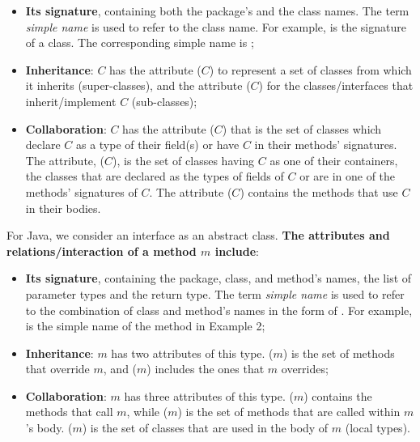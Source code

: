 \begin{itemize}

\item {\bf Its signature}, containing both the package's and the
  class names. The term \emph{simple name} is used to refer to the
  class name. For example,
   is the
  signature of a class. The corresponding simple name is
  ;

\item {\bf Inheritance}: $C$ has the attribute
  ($C$) to represent a set of classes from which it
  inherits (super-classes), and the attribute ($C$)
  for the classes/interfaces that inherit/implement $C$ (sub-classes);

\item {\bf Collaboration}: $C$ has the attribute
  ($C$) that is the set of classes which declare $C$ as
  a type of their field(s) or have $C$ in their methods'
  signatures. The attribute, ($C$), is the set of
  classes having $C$ as one of their containers, \ie the classes that
  are declared as the types of fields of $C$ or are in one of the
  methods' signatures of $C$. The attribute ($C$) contains
  the methods that use $C$ in their bodies.

\end{itemize}

\noindent For Java, we consider an interface as an abstract class. {\bf The
attributes and relations/interaction of a method $m$ include}:

\begin{itemize}

\item {\bf Its signature}, containing the package, class, and method's
names, the list of parameter types and the return type. The term {\em
simple name} is used to refer to the combination of class and
method's names in the form of . For example,
 is the simple name of the method in
Example 2;


\item {\bf Inheritance}: $m$ has two attributes of this type.
($m$) is the set of methods that override $m$, and
($m$) includes the ones that $m$ overrides;

\item {\bf Collaboration}: $m$ has three attributes of
this type. ($m$) contains the methods that call $m$,
while ($m$) is the set of methods that are called within
$m$'s body. ($m$) is the set of classes that are used in
the body of $m$ (\ie local types).

\end{itemize}

